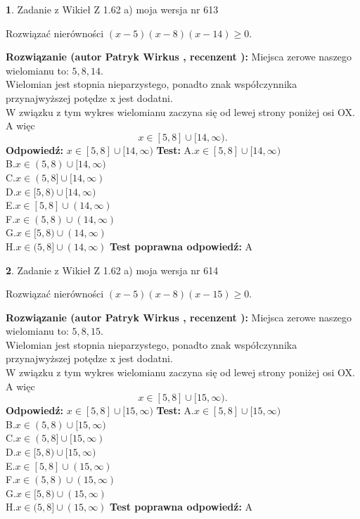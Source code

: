 \documentclass[12pt, a4paper]{article}
\theoremstyle{definition} %
\newtheorem{zad}{}
\newcommand{\zadStart}[1]{\begin{zad}#1\newline}
\newcommand{\zadStop}{\end{zad}}
\newcommand{\rozwStart}[2]{\noindent \textbf{Rozwiązanie (autor #1 , recenzent #2): }\newline}
\newcommand{\rozwStop}{\newline}
\newcommand{\odpStart}{\noindent \textbf{Odpowiedź:}\newline}
\newcommand{\odpStop}{\newline}
\newcommand{\testStart}{\noindent \textbf{Test:}\newline}
\newcommand{\testStop}{\newline}
\newcommand{\kluczStart}{\noindent \textbf{Test poprawna odpowiedź:}\newline}
\newcommand{\kluczStop}{\newline}
\begin{document}
\zadStart{Zadanie z Wikieł Z 1.62 a) moja wersja nr 613}

Rozwiązać nierówności $(x-5)(x-8)(x-14)\ge0$.
\zadStop
\rozwStart{Patryk Wirkus}{}
Miejsca zerowe naszego wielomianu to: $5, 8, 14$.\\
Wielomian jest stopnia nieparzystego, ponadto znak współczynnika przy\linebreak najwyższej potędze x jest dodatni.\\ W związku z tym wykres wielomianu zaczyna się od lewej strony poniżej osi OX. A więc $$x \in [5,8] \cup [14,\infty).$$
\rozwStop
\odpStart
$x \in [5,8] \cup [14,\infty)$
\odpStop
\testStart
A.$x \in [5,8] \cup [14,\infty)$\\
B.$x \in (5,8) \cup [14,\infty)$\\
C.$x \in (5,8] \cup [14,\infty)$\\
D.$x \in [5,8) \cup [14,\infty)$\\
E.$x \in [5,8] \cup (14,\infty)$\\
F.$x \in (5,8) \cup (14,\infty)$\\
G.$x \in [5,8) \cup (14,\infty)$\\
H.$x \in (5,8] \cup (14,\infty)$
\testStop
\kluczStart
A
\kluczStop



\zadStart{Zadanie z Wikieł Z 1.62 a) moja wersja nr 614}

Rozwiązać nierówności $(x-5)(x-8)(x-15)\ge0$.
\zadStop
\rozwStart{Patryk Wirkus}{}
Miejsca zerowe naszego wielomianu to: $5, 8, 15$.\\
Wielomian jest stopnia nieparzystego, ponadto znak współczynnika przy\linebreak najwyższej potędze x jest dodatni.\\ W związku z tym wykres wielomianu zaczyna się od lewej strony poniżej osi OX. A więc $$x \in [5,8] \cup [15,\infty).$$
\rozwStop
\odpStart
$x \in [5,8] \cup [15,\infty)$
\odpStop
\testStart
A.$x \in [5,8] \cup [15,\infty)$\\
B.$x \in (5,8) \cup [15,\infty)$\\
C.$x \in (5,8] \cup [15,\infty)$\\
D.$x \in [5,8) \cup [15,\infty)$\\
E.$x \in [5,8] \cup (15,\infty)$\\
F.$x \in (5,8) \cup (15,\infty)$\\
G.$x \in [5,8) \cup (15,\infty)$\\
H.$x \in (5,8] \cup (15,\infty)$
\testStop
\kluczStart
A
\kluczStop
\end{document}
